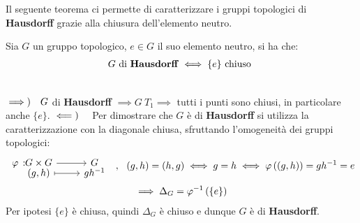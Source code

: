Il seguente teorema ci permette di caratterizzare i gruppi topologici di \textbf{Hausdorff} grazie alla chiusura dell'elemento neutro.
\begin{theorema}
	Sia $G$ un gruppo topologico, $e\in G$ il suo elemento neutro, si ha che:
		\begin{gather*}
			G \ \text{di \textbf{Hausdorff}} \iff \{e\} \text{ chiuso }
		\end{gather*}
	\vspace{-6mm}
\end{theorema}
\begin{demonstration}~{}\\
	$\implies)\quad G$ di \textbf{Hausdorff} $\implies G \ T_1 \implies$ tutti i punti sono chiusi, in particolare anche $\{e\}$. \newline
	$\impliedby)\quad$ Per dimostrare che $G$ è di \textbf{Hausdorff} si utilizza la caratterizzazione con la diagonale chiusa, sfruttando l'omogeneità dei gruppi topologici:
		\begin{gather*}
			\funztot \phi {G\times G} G {(g,h)} {gh^{-1}} \ \ , \ \ (g,h)=(h,g) \iff g=h\iff \phi\left( (g,h)\right)=gh^{-1}=e \\
			\implies \Delta_G =\phi^{-1}\left(\{e\}\right)
		\end{gather*}
	Per ipotesi $\{e\}$ è chiusa, quindi $\Delta_G$ è chiuso e dunque $G$ è di \textbf{Hausdorff}.
\end{demonstration}

